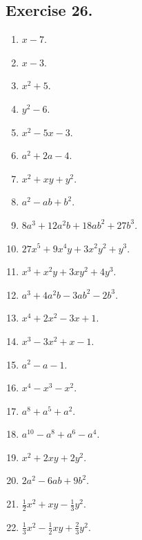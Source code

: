 \documentclass{book}
\begin{document}
\subsection*{Exercise 26.}
\begin{enumerate}

\item $x - 7$.

\item $x - 3$.

\item $x^2 + 5$.

\item $y^2 - 6$.

\item $x^2 - 5x - 3$.

\item $a^2 + 2a - 4$.

\item $x^2 + xy + y^2$.

\item $a^2 - ab + b^2$.

\item $8a^3 + 12a^2 b + 18ab^2 + 27b^3$.


\item $27x^5 + 9x^4y + 3x^2y^2 + y^3$.

\item $x^3 + x^2y + 3xy^2 + 4y^3$.

\item $a^3 + 4a^2b - 3ab^2 - 2b^3$.

\item $x^4 + 2x^2 - 3x + 1.$

\item $x^3 - 3x^2 + x - 1$.

\item $a^2 - a - 1$.

\item $x^4 - x^3 - x^2$.

\item $a^8 + a^5 + a^2$.

\item $a^10 - a^8 + a^6 - a^4$.

\item $x^2 + 2xy + 2y^2$.

\item $2a^2 - 6ab + 9b^2$.

\item $\frac{1}{2} x^2 + xy - \frac{1}{3} y^2$.

\item $\frac{1}{3} x^2 - \frac{1}{2} xy + \frac {2}{3} y^2$.


\end{enumerate}
\end{document}

